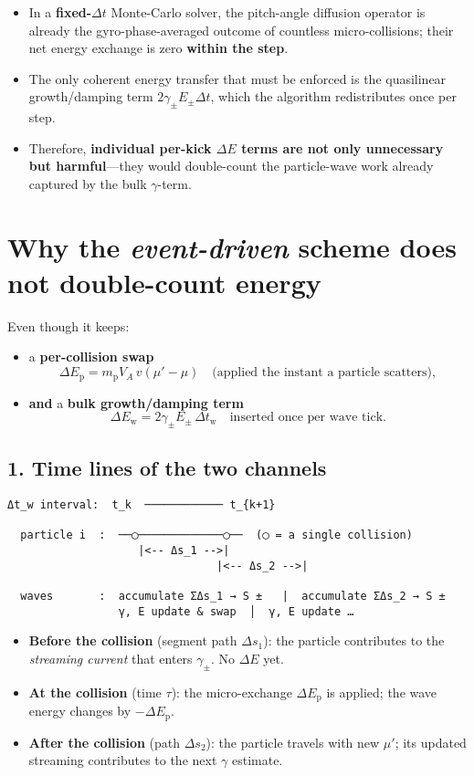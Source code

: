 {\begin{itemize}
\item In a \textbf{fixed-$\Delta t$} Monte-Carlo solver, the pitch-angle diffusion operator is already the gyro-phase-averaged outcome of countless micro-collisions; their net energy exchange is zero \textbf{within the step}.
\item The only coherent energy transfer that must be enforced is the quasilinear growth/damping term $2\gamma_\pm E_\pm \Delta t$, which the algorithm redistributes once per step.
\item Therefore, \textbf{individual per-kick $\Delta E$ terms are not only unnecessary but harmful}—they would double-count the particle-wave work already captured by the bulk $\gamma$-term.
\end{itemize}

\section*{Why the \emph{event-driven} scheme does \textbf{not} double-count energy}

Even though it keeps:
\begin{itemize}
  \item a \textbf{per-collision swap} 
  \[
  \Delta E_{\mathrm p} = m_{\mathrm p} V_A\,v(\mu' - \mu)
  \quad \text{(applied the instant a particle scatters)},
  \]
  \item \textbf{and} a \textbf{bulk growth/damping term}
  \[
  \Delta E_{\mathrm w} = 2\gamma_\pm E_\pm\,\Delta t_{\mathrm w}
  \quad \text{inserted once per wave tick}.
  \]
\end{itemize}

\subsection*{1. Time lines of the two channels}

\begin{verbatim}
Δt_w interval:  t_k  ──────────── t_{k+1}

  particle i  :  ──◯─────────────◯──  (◯ = a single collision)
                    |<-- Δs_1 -->|
                                |<-- Δs_2 -->|

  waves       :  accumulate ΣΔs_1 → S ±   |  accumulate ΣΔs_2 → S ±
                 γ, E update & swap  │  γ, E update …
\end{verbatim}

\begin{itemize}
  \item \textbf{Before the collision} (segment path $\Delta s_1$):  
  the particle contributes to the \emph{streaming current} that enters $\gamma_\pm$. No $\Delta E$ yet.
  \item \textbf{At the collision} (time $\tau$):  
  the micro-exchange $\Delta E_{\mathrm p}$ is applied; the wave energy changes by $-\Delta E_{\mathrm p}$.
  \item \textbf{After the collision} (path $\Delta s_2$):  
  the particle travels with new $\mu'$; its updated streaming contributes to the next $\gamma$ estimate.
\end{itemize}

}
